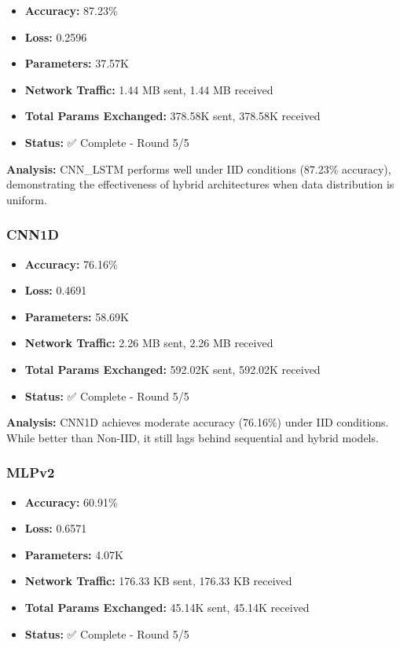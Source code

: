 \documentclass[12pt,a4paper]{article}
\begin{document}
\begin{itemize}
    \item \textbf{Accuracy:} 87.23\%
    \item \textbf{Loss:} 0.2596
    \item \textbf{Parameters:} 37.57K
    \item \textbf{Network Traffic:} 1.44 MB sent, 1.44 MB received
    \item \textbf{Total Params Exchanged:} 378.58K sent, 378.58K received
    \item \textbf{Status:} ✅ Complete - Round 5/5
\end{itemize}

\textbf{Analysis:} CNN\_LSTM performs well under IID conditions (87.23\% accuracy), demonstrating the effectiveness of hybrid architectures when data distribution is uniform.

\subsubsection{CNN1D}

\begin{itemize}
    \item \textbf{Accuracy:} 76.16\%
    \item \textbf{Loss:} 0.4691
    \item \textbf{Parameters:} 58.69K
    \item \textbf{Network Traffic:} 2.26 MB sent, 2.26 MB received
    \item \textbf{Total Params Exchanged:} 592.02K sent, 592.02K received
    \item \textbf{Status:} ✅ Complete - Round 5/5
\end{itemize}

\textbf{Analysis:} CNN1D achieves moderate accuracy (76.16\%) under IID conditions. While better than Non-IID, it still lags behind sequential and hybrid models.

\subsubsection{MLPv2}

\begin{itemize}
    \item \textbf{Accuracy:} 60.91\%
    \item \textbf{Loss:} 0.6571
    \item \textbf{Parameters:} 4.07K
    \item \textbf{Network Traffic:} 176.33 KB sent, 176.33 KB received
    \item \textbf{Total Params Exchanged:} 45.14K sent, 45.14K received
    \item \textbf{Status:} ✅ Complete - Round 5/5
\end{itemize}
\end{document}
